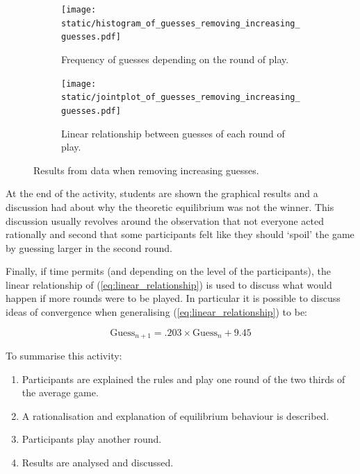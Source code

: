 \documentclass{article}
\begin{document}
\begin{figure}[!hbtp]
    \begin{subfigure}{.6\textwidth}
        \centering
        \texttt{[image: static/histogram\_of\_guesses\_removing\_increasing\_guesses.pdf]}
        \caption{Frequency of guesses depending on the round of play.}
        \label{fig:histogram_of_guess}
    \end{subfigure}
    \begin{subfigure}{.4\textwidth}
        \centering
        \texttt{[image: static/jointplot\_of\_guesses\_removing\_increasing\_guesses.pdf]}
        \caption{Linear relationship between guesses of each round of play.}
        \label{fig:jointplot_of_guess}
    \end{subfigure}
    \caption{Results from data when removing increasing guesses.}
    \label{fig:results_with_decreasing_guess}
\end{figure}

At the end of the activity, students are shown the graphical results and a
discussion had about why the theoretic equilibrium was not the winner. This
discussion usually revolves around the observation that not everyone acted
rationally and second that some participants felt like they should `spoil' the
game by guessing larger in the second round.

Finally, if time permits (and depending on the level of the participants), the
linear relationship of (\ref{eq:linear_relationship}) is used to discuss what
would happen if more rounds were to be played. In particular it is possible to
discuss ideas of convergence when generalising (\ref{eq:linear_relationship}) to
be:

\begin{equation}
    \text{Guess}_{n+1} = .203\times\text{Guess}_n + 9.45
    \label{eq:extrapolated_linear_relationship}
\end{equation}

To summarise this activity:

\begin{enumerate}
    \item Participants are explained the rules and play one round of the two
        thirds of the average game.
    \item A rationalisation and explanation of equilibrium behaviour is
        described.
    \item Participants play another round.
    \item Results are analysed and discussed.
\end{enumerate}
\end{document}

